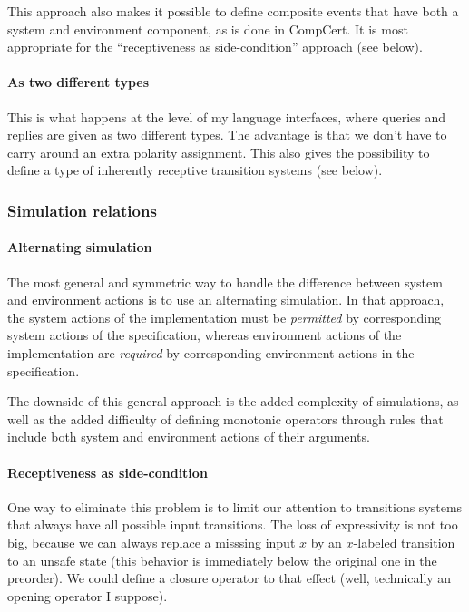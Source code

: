 \documentclass[11pt]{article}
\begin{document}
This approach also makes it possible to define
composite events that have both a system and environment component,
as is done in CompCert.
It is most appropriate for the
``receptiveness as side-condition''
approach (see below).

\paragraph{As two different types}

This is what happens at the level of my language interfaces,
where queries and replies are given
as two different types.
The advantage is that we don't have to carry around
an extra polarity assignment.
This also gives the possibility to define
a type of
inherently receptive transition systems (see below).


\subsubsection{Simulation relations} %

\paragraph{Alternating simulation}

The most general and symmetric way to
handle the difference between system and environment actions
is to use an alternating simulation.
In that approach,
the system actions of the implementation must be \emph{permitted}
by corresponding system actions of the specification,
whereas environment actions of the implementation are \emph{required}
by corresponding environment actions in the specification.

The downside of this general approach is
the added complexity of simulations,
as well as the added difficulty of defining
monotonic operators
through rules that include
both system and environment actions
of their arguments.

\paragraph{Receptiveness as side-condition}

One way to eliminate this problem is to limit our attention to
transitions systems that always have all possible input transitions.
The loss of expressivity is not too big,
because we can always replace a misssing input $x$
by an $x$-labeled transition to an unsafe state
(this behavior is immediately below the original one in the preorder).
We could define a closure operator to that effect
(well, technically an opening operator I suppose).
\end{document}
